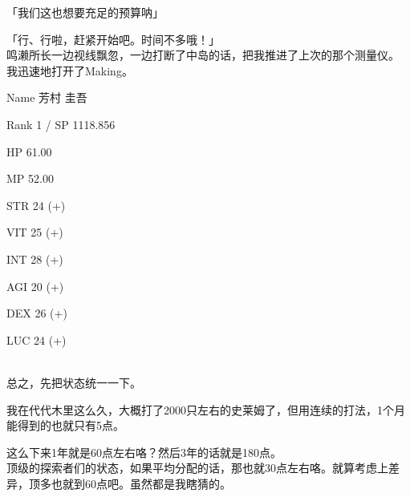 「我们这也想要充足的预算呐」

「行、行啦，赶紧开始吧。时间不多哦！」\\

鸣濑所长一边视线飘忽，一边打断了中岛的话，把我推进了上次的那个测量仪。\\

我迅速地打开了Making。\\

\cardline

  Name 芳村 圭吾

  Rank 1 / SP 1118.856

  HP  61.00

  MP  52.00

%  
 

  STR 24 (+)

  VIT 25 (+)

  INT 28 (+)

  AGI 20 (+)

  DEX 26 (+)

  LUC 24 (+)

\cardline\\

总之，先把状态统一一下。

我在代代木里这么久，大概打了2000只左右的史莱姆了，但用连续的打法，1个月能得到的也就只有5点。

这么下来1年就是60点左右咯？然后3年的话就是180点。\\

顶级的探索者们的状态，如果平均分配的话，那也就30点左右咯。就算考虑上差异，顶多也就到60点吧。虽然都是我瞎猜的。

